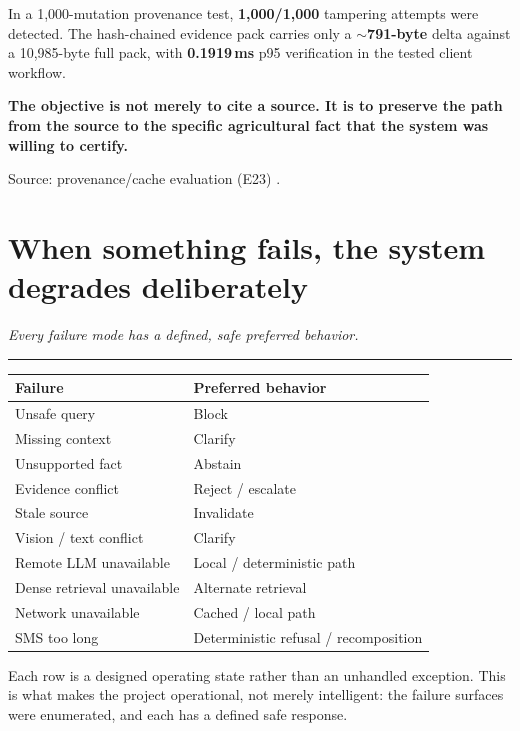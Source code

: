 \documentclass[11pt,a4paper]{article}
\newcommand{\MEASURED}{\badgeM{MEASURED}}
\newcommand{\takeaway}[1]{{\color{kcgrey}\itshape\large #1}\par\vspace{2pt}%
  {\color{kcline}\rule{\linewidth}{0.8pt}}\par\vspace{6pt}}
\newcommand{\srcfoot}[1]{\par\vspace{4pt}{\color{kcline}\rule{\linewidth}{0.4pt}}\par
  {\footnotesize\color{kcgrey}#1}\par}
\begin{document}
\vspace{3pt}
In a 1,000-mutation provenance test, \textbf{1,000/1,000} tampering attempts were
detected. The hash-chained evidence pack carries only a \textbf{$\sim$791-byte}
delta against a 10,985-byte full pack, with \textbf{0.1919\,ms} p95 verification
in the tested client workflow.

\begin{pullquote}
{\bfseries\color{kcgreen}The objective is not merely to cite a source. It is to preserve the path from the source to the specific agricultural fact that the system was willing to certify.}
\end{pullquote}

\srcfoot{Source: provenance/cache evaluation (E23) \MEASURED{}.}

\newpage
\section*{\color{kcgreen}When something fails, the system degrades deliberately}
\takeaway{Every failure mode has a defined, safe preferred behavior.}

\begin{center}
\begin{tabularx}{\linewidth}{Xl}
\toprule
\textbf{Failure} & \textbf{Preferred behavior}\\
\midrule
Unsafe query & Block\\
Missing context & Clarify\\
Unsupported fact & Abstain\\
Evidence conflict & Reject / escalate\\
Stale source & Invalidate\\
Vision / text conflict & Clarify\\
Remote LLM unavailable & Local / deterministic path\\
Dense retrieval unavailable & Alternate retrieval\\
Network unavailable & Cached / local path\\
SMS too long & Deterministic refusal / recomposition\\
\bottomrule
\end{tabularx}
\end{center}

\vspace{4pt}
Each row is a designed operating state rather than an unhandled exception. This is
what makes the project operational, not merely intelligent: the failure surfaces
were enumerated, and each has a defined safe response.
\end{document}
